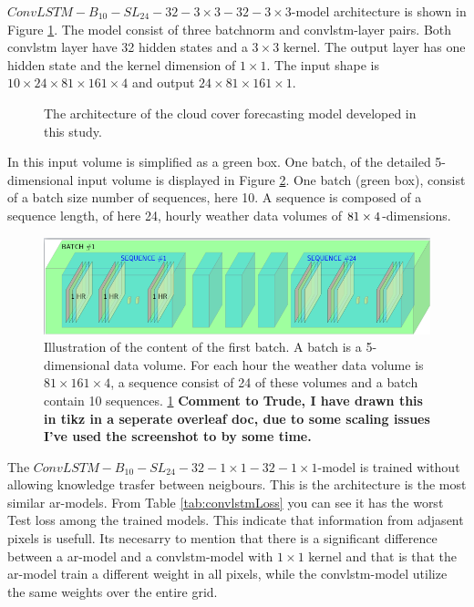 $ConvLSTM-B_{10}-SL_{24}-32-3\times3-32-3 \times3$-model architecture is shown in Figure \ref{fig:best_ml_architecture}. The model consist of three \acrshort{batchnorm}  and  \acrshort{convlstm}-layer pairs. Both \acrshort{convlstm} layer have 32 hidden states and a $3\times 3$ kernel. The output layer has one hidden state and the kernel dimension of $1\times 1$. The input shape is $10\times24\times81\times161\times4$ and output $24\times81\times161\times1$. 
\begin{figure}
    \centering
    
    \caption{The architecture of the cloud cover forecasting model developed in this study. }
    \label{fig:best_ml_architecture}
\end{figure}
In this input volume is simplified as a green box. One batch, of the detailed 5-dimensional input volume is displayed in Figure \ref{fig:input_volume_conv_lstm}. One batch (green box), consist of a batch size number of sequences, here 10. A sequence is composed of a sequence length, of here 24, hourly weather data volumes of $81\time161\times4$-dimensions.
\begin{figure}
    \centering
    \includegraphics[scale=0.6]{ChapterX_Results_and_Conclusion/computational_experiments/temp_input_volume.png}
    \caption{Illustration of the content of the first batch. A batch is a 5-dimensional data volume. For each hour the weather data volume is $81\times 161\times 4$, a sequence consist of 24 of these volumes and a batch contain 10 sequences. \ref{fig:best_ml_architecture} \textbf{Comment to Trude, I have drawn this in tikz in a seperate overleaf doc, due to some scaling issues I've used the screenshot to by some time.}}
    \label{fig:input_volume_conv_lstm}
\end{figure}

The $ConvLSTM-B_{10}-SL_{24}-32-1\times1-32-1 \times1$-model is trained without allowing knowledge trasfer between neigbours. This is the architecture is the most similar \acrshort{ar}-models. From Table \ref{tab:convlstmLoss} you can see it has the worst Test loss among the trained models. This indicate that information from adjasent pixels is usefull. Its necesarry to mention that there is a significant difference between a \acrshort{ar}-model and a \acrshort{convlstm}-model with $1\times 1$ kernel and that is that the \acrshort{ar}-model train a different weight in all pixels, while the \acrshort{convlstm}-model utilize the same weights over the entire grid. 
\clearpage


